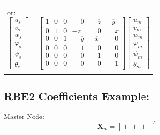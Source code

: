 \documentclass[10pt,b5paper,titlepage]{book}
\newcommand{\m}{\mathbf}
\newenvironment{bbox}[1][0.96]
{
    \begin{center}
        \begin{tabular}{|p{#1\textwidth}|}
            \hline\\
}
{
            \\\\\hline
        \end{tabular}
    \end{center}
}
\begin{document}
\begin{bbox}[0.95]
    or:
    \begin{equation}
        \begin{bmatrix}
            u_s \\
            v_s \\
            w_s \\
            \varphi_s \\
            \psi_s \\
            \theta_s
        \end{bmatrix}
        = \begin{bmatrix}
            1 & 0 & 0 & \phantom{-}0 & \phantom{-}\overline{z} & -\overline{y} \\
            0 & 1 & 0 & -\overline{z} & \phantom{-}0 & \phantom{-}\overline{x} \\
            0 & 0 & 1 & \phantom{-}\overline{y} & -\overline{x} & \phantom{-}0 \\
            0 & 0 & 0 & \phantom{-}1 & \phantom{-}0 & \phantom{-}0 \\
            0 & 0 & 0 & \phantom{-}0 & \phantom{-}1 & \phantom{-}0 \\
            0 & 0 & 0 & \phantom{-}0 & \phantom{-}0 & \phantom{-}1 \\
        \end{bmatrix}
        \begin{bmatrix}
            u_m \\
            v_m \\
            w_m \\
            \varphi_m \\
            \psi_m \\
            \theta_m
        \end{bmatrix}
    \end{equation}
\end{bbox}

\subsection{RBE2 Coefficients Example:}

Master Node:
\begin{equation}
    \m{X}_m =
    \begin{bmatrix}
        1 & 1 & 1
    \end{bmatrix}^T
\end{equation}
\end{document}
